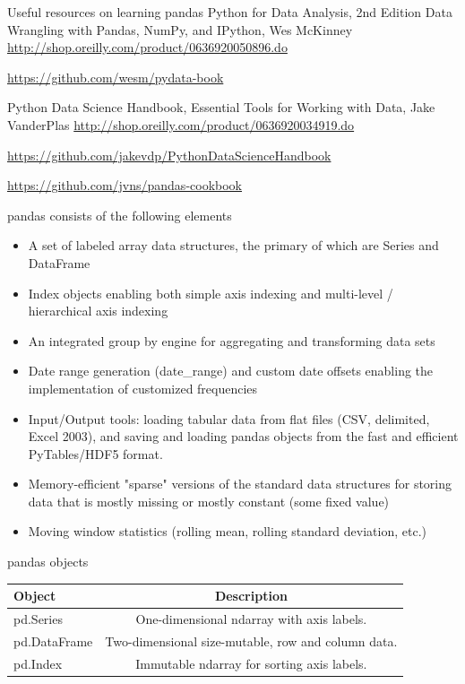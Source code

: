 \documentclass[10pt]{beamer}
\begin{document}
\begin{frame}{Useful resources on learning pandas}
Python for Data Analysis, 2nd Edition Data Wrangling with Pandas, NumPy, and IPython, Wes McKinney \url{http://shop.oreilly.com/product/0636920050896.do}

\url{https://github.com/wesm/pydata-book}

Python Data Science Handbook, Essential Tools for Working with Data, Jake VanderPlas \url{http://shop.oreilly.com/product/0636920034919.do}

\url{https://github.com/jakevdp/PythonDataScienceHandbook}

\url{https://github.com/jvns/pandas-cookbook}
\end{frame}

\begin{frame}{pandas consists of the following elements}

\begin{itemize}
\item A set of labeled array data structures, the primary of which are Series and DataFrame
\item Index objects enabling both simple axis indexing and multi-level / hierarchical axis indexing
\item An integrated group by engine for aggregating and transforming data sets
\item Date range generation (date\_range) and custom date offsets enabling the implementation of customized frequencies
\item Input/Output tools: loading tabular data from flat files (CSV, delimited, Excel 2003), and saving and loading pandas objects from the fast and efficient PyTables/HDF5 format.
\item Memory-efficient "sparse" versions of the standard data structures for storing data that is mostly missing or mostly constant (some fixed value)
\item Moving window statistics (rolling mean, rolling standard deviation, etc.)
\end{itemize}
\end{frame}


\begin{frame}[fragile]{pandas objects}
\begin{table}
\begin{tabular}{lc}
\textbf{Object} & \textbf{Description} \\
\hline
pd.Series & One-dimensional ndarray with axis labels. \\
pd.DataFrame & Two-dimensional size-mutable, row and column data. \\
pd.Index & Immutable ndarray for sorting axis labels. 
\end{tabular}
\end{table}
\end{frame}
\end{document}
